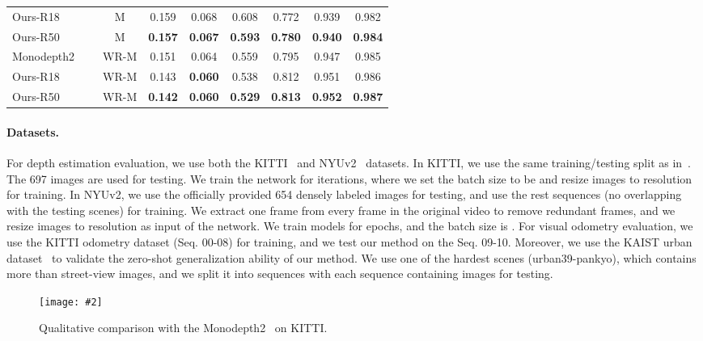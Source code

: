 \documentclass[twocolumn]{svjour3}
\renewcommand{\cite}[1]{\textcolor{blue}{\citep{#1}}}
\newcommand{\addImg}[2][0.495]{\texttt{[image: \#2]}}
\begin{document}
\begin{table*}[t]
\begin{tabular}{l c c | c c c  | c c c}
     Ours-R18 &  & M  &  0.159  &   0.068  &   0.608  &   0.772  &   0.939  &   0.982  \\
     Ours-R50 &  & M  & \textbf{0.157}  &   \textbf{0.067}  &   \textbf{0.593}  &   \textbf{0.780}  &   \textbf{0.940}  &   \textbf{0.984}  \\
     \hline
     Monodepth2~\cite{monodepth2} &  & WR-M & 0.151  &  0.064  &   0.559  &   0.795  &  0.947 &   0.985 \\ 
     Ours-R18 &  & WR-M & 0.143  &   \textbf{0.060}  &   0.538  &   0.812  &   0.951  &   0.986   \\
     Ours-R50 &  & WR-M & \textbf{0.142}  &   \textbf{0.060}  &   \textbf{0.529}  &   \textbf{0.813}  &   \textbf{0.952}  &   \textbf{0.987}  \\
     \hline
    \end{tabular}
\end{table*}



\paragraph{Datasets.}
For depth estimation evaluation, we use both the KITTI~\cite{Geiger2013IJRR} and NYUv2~\cite{silberman2012indoor} datasets.
In KITTI, we use the same training/testing split as in~\cite{zhou2017unsupervised}.
The 697 images are used for testing.
We train the network for  iterations, where we set the batch size to be  and resize images to  resolution for training.
In NYUv2, we use the officially provided 654 densely labeled images for testing,
and use the rest sequences (no overlapping with the testing scenes) for training.
We extract one frame from every  frame in the original video to remove redundant frames,
and we resize images to  resolution as input of the network.
We train models for  epochs, and the batch size is .
For visual odometry evaluation,
we use the KITTI odometry dataset (Seq. 00-08) for training, and we test our method on the Seq. 09-10.
Moreover, we use the KAIST urban dataset~\cite{jeong2019complex} to validate the zero-shot generalization ability of our method.
We use one of the hardest scenes (urban39-pankyo), which contains more than  street-view images,
and we split it into  sequences with each sequence containing  images for testing.


\begin{figure}[t]
  \centering
  \addImg[0.48]{images/kitti_vis.pdf}
  \caption{Qualitative comparison with the Monodepth2~\cite{monodepth2} on KITTI.
  }\label{fig:kitti_vis}
\end{figure}
\end{document}
